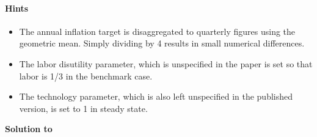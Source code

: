 \paragraph{Hints}

\begin{itemize}

\item The annual inflation target is disaggregated to quarterly figures using the geometric mean.
Simply dividing by 4 results in small numerical differences.

\item The labor disutility parameter, which is unspecified in the paper is set so that labor is 1/3 in the benchmark case.

\item The technology parameter, which is also left unspecified in the published version, is set to 1 in steady state.
  
\end{itemize}


\begin{solution}\textbf{Solution to }
\ifDisplaySolutions

\fi
\newpage
\end{solution}